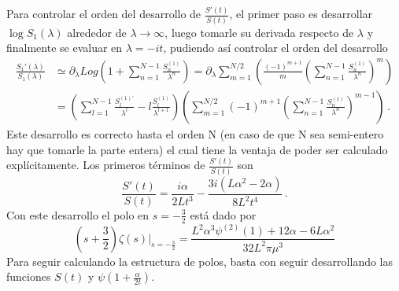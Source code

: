 Para controlar el orden del desarrollo de $ \frac{S' ( t)}{ S ( t)} $, el primer paso es desarrollar $\log S _1 (\lambda)$ alrededor de $\lambda \rightarrow \infty$, luego tomarle su derivada respecto de $\lambda$ y finalmente se evaluar en $\lambda = -i t$, pudiendo así controlar el orden del desarrollo
\begin{equation}
\begin{aligned}
\frac{S _1 '( \lambda)}{S _1 ( \lambda )} &\simeq 
\partial _{\lambda} Log \left(
						1 + \sum _{n=1} ^{N-1}  \frac{S ^{(1)} _n}{\lambda ^n}
						\right) =
\partial _{\lambda} 
\sum _{m = 1} ^{N/2} 
	\left(
	\frac{(-1) ^{m+1} }{m}
	\left(
		\sum _{n=1} ^{N-1} \frac{S ^{(1)} _n}{\lambda ^n}
		\right) ^m 
	\right)  \\[10pt]
	&=
\left(								
	\sum _{l = 1} ^{N-1} 
	\frac{S  ^{(1) '} _l}{\lambda ^l} - l \frac{S ^{(1)}  _l}{\lambda ^{l+1}}
	\right)							
\left(
	\sum _{m = 1} ^{N/2} (-1) ^{m+1} 
	\left(
			\sum _{n=1} ^{N-1} \frac{S ^{(1)} _n}{\lambda ^n}
			\right) ^{m-1}		
	\right)
\, .
\end{aligned}	
\end{equation}
Este desarrollo  es correcto hasta el orden N (en caso de que N sea semi-entero hay que tomarle la parte entera) el cual tiene la ventaja de poder ser calculado explícitamente. Los primeros términos de $\frac{S'(t)}{S(t)}$ son
\begin{equation}
\frac{S'(t)}{S(t)} = 
\frac{i \alpha}{2 L t^3} -
\frac{3 i (L \alpha ^2 - 2 \alpha)}{8 L^2 t ^4}
\, .
\end{equation}
Con este desarrollo el polo en $s=-\frac{3}{2}$ está dado por 
\begin{equation}
\left( s+ \frac{3}{2} \right)
\zeta  (s) \Big| _{s = - \frac{3}{2}}= 
\frac{L ^2 \alpha  ^3 \psi ^{(2)} (1) + 12   \alpha  - 6 L \alpha ^2}{32 L^2 \pi \mu ^3}
\end{equation}
Para seguir calculando la estructura de polos, basta con seguir desarrollando las funciones $S(t)$ y $\psi (1 + \frac{\alpha}{2 t})$.


